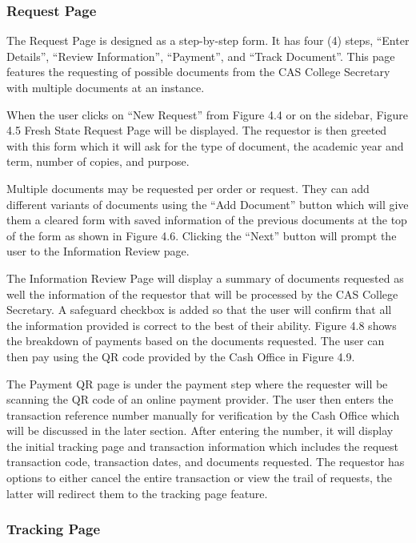 \subsubsection{Request Page}

The Request Page is designed as a step-by-step form. It has four (4) steps, “Enter Details”, “Review Information”, “Payment”, and “Track Document”. This page features the requesting of possible documents from the CAS College Secretary with multiple documents at an instance.

When the user clicks on “New Request” from Figure 4.4 or on the sidebar, Figure 4.5 Fresh State Request Page will be displayed. The requestor is then greeted with this form which it will ask for the type of document, the academic year and term, number of copies, and purpose. 

Multiple documents may be requested per order or request. They can add different variants of documents using the “Add Document” button which will give them a cleared form with saved information of the previous documents at the top of the form as shown in Figure 4.6. Clicking the “Next” button will prompt the user to the Information Review page.

The Information Review Page will display a summary of documents requested as well the information of the requestor that will be processed by the CAS College Secretary. A safeguard checkbox is added so that the user will confirm that all the information provided is correct to the best of their ability. Figure 4.8 shows the breakdown of payments based on the documents requested. The user can then pay using the QR code provided by the Cash Office in Figure 4.9.

The Payment QR page is under the payment step where the requester will be scanning the QR code of an online payment provider. The user then enters the transaction reference number manually for verification by the Cash Office which will be discussed in the later section. After entering the number, it will display the initial tracking page and transaction information which includes the request transaction code, transaction dates, and documents requested. The requestor has options to either cancel the entire transaction or view the trail of requests, the latter will redirect them to the tracking page feature.

\subsubsection{Tracking Page}

